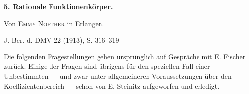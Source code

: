 \begin{center}
{\Large\bfseries 5. Rationale Funktionenkörper.}\par
\vspace{1.2em}
Von \textsc{Emmy Noether} in Erlangen.\par
\medskip
J. Ber. d. DMV 22 (1913), S. 316--319
\end{center}

\vspace{2em}

Die folgenden Fragestellungen gehen ursprünglich auf Gespräche mit E. Fischer zurück. Einige der Fragen sind übrigens für den speziellen Fall einer Unbestimmten --- und zwar unter allgemeineren Voraussetzungen über den Koeffizientenbereich --- schon von E. Steinitz aufgeworfen und erledigt.
